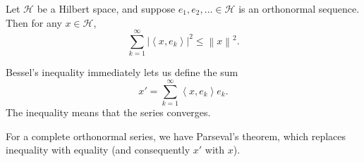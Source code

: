 \documentclass[12pt]{article}
\newcommand{\norm}[1]{\left\|#1\right\|}
\begin{document}
\newcommand{\Hilb}{\mathcal{H}}
\newcommand{\size}[1]{\left|#1\right|}
\newcommand{\scalar}[2]{\left\langle#1,#2\right\rangle}
Let $\Hilb$ be a Hilbert space, and suppose $e_1, e_2, \ldots \in \Hilb$ is an orthonormal sequence.  Then for any $x\in\Hilb$,
$$
\sum_{k=1}^{\infty}\size{\scalar{x}{e_k}}^2 \le \norm{x}^2.
$$

Bessel's inequality immediately lets us define the sum
$$
x' = \sum_{k=1}^{\infty}\scalar{x}{e_k}e_k.
$$
The inequality means that the series converges.

For a complete orthonormal series, we have Parseval's theorem, which replaces inequality with equality (and consequently $x'$ with $x$).
\end{document}
